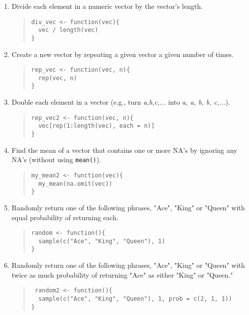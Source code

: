 \documentclass{article}
\begin{document}
\begin{enumerate}
\item Divide each element in a numeric vector by the vector's length.
  \begin{quote}
    \begin{verbatim}
div_vec <- function(vec){
  vec / length(vec)
}
    \end{verbatim}
  \end{quote}

\item Create a new vector by repeating a given vector a given number of times.
  \begin{quote}
    \begin{verbatim}
rep_vec <- function(vec, n){
  rep(vec, n)	
}
    \end{verbatim}
  \end{quote}

\item Double each element in a vector (e.g., turn \emph{a,b,c,...} into \emph{a, a, b, b, c,...}).
  \begin{quote}
    \begin{verbatim}
rep_vec2 <- function(vec, n){
  vec[rep(1:length(vec), each = n)]
}
    \end{verbatim}
  \end{quote}

\item Find the mean of a vector that contains one or more NA's by ignoring any NA's (without using \verb!mean()!).
  \begin{quote}
    \begin{verbatim}
my_mean2 <- function(vec){
  my_mean(na.omit(vec))
}

    \end{verbatim}
  \end{quote}

\item Randomly return one of the following phrases, "Ace", "King" or "Queen" with equal probability of returning each.
  \begin{quote}
    \begin{verbatim}
random <- function(){
  sample(c("Ace", "King", "Queen"), 1)
}
    \end{verbatim}
  \end{quote}

\item Randomly return one of the following phrases, "Ace", "King" or "Queen" with twice as much probability of returning "Ace" as either "King" or "Queen."
  \begin{quote}
    \begin{verbatim}
 random2 <- function(){
  sample(c("Ace", "King", "Queen"), 1, prob = c(2, 1, 1))
}
    \end{verbatim}
  \end{quote}


\end{enumerate}
\end{document}
